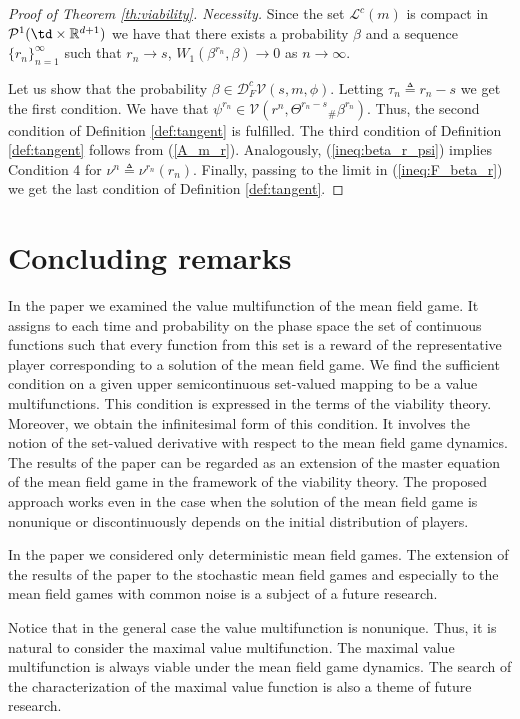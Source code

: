 \documentclass[a4paper,12pt]{article}
\newcommand{\rdp}{\mathbb{R}^{d+1}}
\begin{document}
\begin{proof}[Proof of Theorem \ref{th:viability}. Necessity]
	Since the set $\mathcal{L}^c(m)$ is compact in $\mathcal{P}^1(\td\times\rdp)$ we have that there exists a probability $\beta$ and a sequence $\{r_n\}_{n=1}^\infty$ such that
	$r_n\rightarrow s$, $W_1(\beta^{r_n},\beta)\rightarrow 0$ as $n\rightarrow\infty$.
	
	Let us show that the probability $\beta\in \mathcal{D}^c_F\mathcal{V}(s,m,\phi)$. Letting $\tau_n\triangleq r_n-s$ we get the first condition. We have that
	$\psi^{r_n}\in\mathcal{V}(r^n,\Theta^{r_n-s}{}_\#\beta^{r_n})$. Thus, the second condition of Definition \ref{def:tangent} is fulfilled. The third condition of Definition \ref{def:tangent} follows from (\ref{A_m_r}). Analogously, (\ref{ineq:beta_r_psi}) implies Condition 4 for $\nu^n\triangleq \nu^{r_n}(r_n)$. Finally, passing to the limit in (\ref{ineq:F_beta_r}) we get the last condition of Definition \ref{def:tangent}.
\end{proof}

\section{Concluding remarks}
In the paper we examined the value multifunction of the mean field game. It assigns to each time and probability on the phase space the set of continuous functions such that every function from this set is a reward of the representative player corresponding to a solution of the mean field game.  We find the  sufficient condition on a given upper semicontinuous set-valued mapping to be a value multifunctions. This condition is expressed in the terms of the viability theory. Moreover, we obtain the infinitesimal form of this condition. It involves the notion of the set-valued derivative  with respect to the mean field game dynamics. The results of the paper can be regarded  as an extension of the master equation of the mean field game in the framework of the viability theory. The proposed approach works even in the case when  the solution of the mean field game is nonunique or discontinuously depends on the initial distribution of players.


In the paper we considered only deterministic mean field games. The extension of the results of the paper to the  stochastic mean field games and especially to the mean field games with common noise is  a subject of a future research.

Notice that in the general case the value multifunction is nonunique. Thus, it is natural to consider the maximal  value multifunction. The maximal value multifunction is always viable under the mean field game dynamics. %
The search of the  characterization of the maximal value function is also a theme of future research. 
\end{document}
